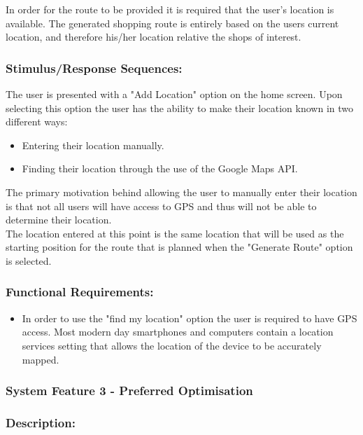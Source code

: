 \documentclass[10pt,twocolumn]{witseiepaper}
\begin{document}
		In order for the route to be provided it is required that the user's location is available. The generated shopping route is entirely based on the users current location, and therefore his/her location relative the shops of interest. 
		
		\subsubsection*{Stimulus/Response Sequences:}
		
		The user is presented with a "Add Location" option on the home screen. Upon selecting this option the user has the ability to make their location known in two different ways:
		
		\begin{itemize}
			\item Entering their location manually.
			\item Finding their location through the use of the Google Maps API.
		\end{itemize}
		
		The primary motivation behind allowing the user to manually enter their location is that not all users will have access to GPS and thus will not be able to determine their location. \\
		
		The location entered at this point is the same location that will be used as the starting position for the route that is planned when the "Generate Route" option is selected.
		
		\subsubsection*{Functional Requirements:}
		
		\begin{itemize}
			\item In order to use the "find my location" option the user is required to have GPS access. Most modern day smartphones and computers contain a location services setting that allows the location of the device to be accurately mapped. 
		\end{itemize}
		
		\subsubsection{System Feature 3 - Preferred Optimisation}
		
		\subsubsection*{Description:}
		
\end{document}
